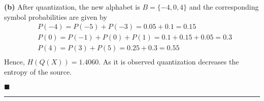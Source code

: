 \documentclass[a4paper,12pt]{article}
\begin{document}
\begin{enumerate}
            \textbf{(b)} 
            After quantization, the new alphabet is $B = \{ -4, 0, 4 \}$ and the corresponding symbol probabilities are given by
            $$ 
            \begin{aligned}
                & P(-4) = P(-5) + P(-3) = 0.05 + 0.1 = 0.15 \\
                & P(0) = P(-1) + P(0) + P(1) = 0.1 + 0.15 + 0.05 = 0.3 \\ 
                & P(4) = P(3) + P(5) = 0.25 + 0.3 = 0.55 \\
            \end{aligned}
            $$
            Hence, $H(Q(X)) = 1.4060$. As it is observed quantization decreases the entropy of the source.
            \begin{flushright}
                $\blacksquare$
            \end{flushright}
    \end{enumerate}
    \rule{\textwidth}{0.4pt}
\end{document}
